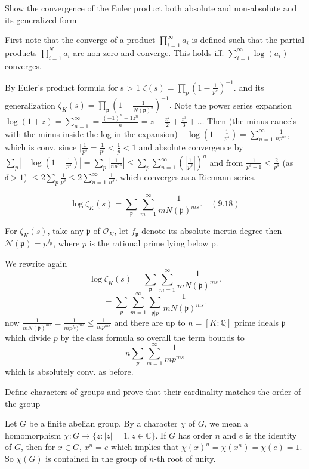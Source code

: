 Show the convergence of the Euler product both absolute and non-absolute
and its generalized form

First note that the converge of a product \( \prod_{i=1}^\infty a_i \) is defined such that
the partial products \( \prod_{i=1}^N a_i \) are non-zero and converge. This holds iff.
\( \sum_{i=1}^\infty \log(a_i) \) converges.

By Euler’s product formula for s > 1
\(\zeta(s) = \prod_{p} \left(1 - \frac{1}{p^s}\right)^{-1}.\)
and its generalization
\(\zeta_K(s) = \prod_{\mathfrak{p}} \left(1 - \frac{1}{N(\mathfrak{p})^s}\right)^{-1}.\)
Note the power series expansion
\( \log(1 + z) = \sum^\infty_{n=1} = \frac{(-1)^n+1z^n}{n} = z - \frac{z^2}{2} + \frac{z^3}{3} + \dots \)
Then (the minus cancels with the minus inside the log in the expansion)
\( -\log(1 - \frac{1}{p^s}) = \sum_{n=1}^\infty \frac{1}{np^{ns}} \), which is conv. since 
\( |\frac{1}{p^s} = \frac{1}{p^\delta} < \frac{1}{p} < 1\)
and absolute convergence by
\( \sum_{p} |-\log(1 - \frac{1}{p^s})| = \sum_{p} |\frac{1}{np^{ns}}| \leq \sum_{p}\sum_{n=1}^\infty (|\frac{1}{p^{\delta}}|)^n\)
and from \( \frac{1}{p^\delta -1} < \frac{2}{p^\delta} \) (as \( \delta > 1 \))
\( \leq 2\sum_p \frac{1}{p^\delta} \leq 2 \sum_{n=1}^\infty \frac{1}{n^\delta}\), which converges as a Riemann series.

\[
\log \zeta_K(s) = \sum_{\mathfrak{p}} \sum_{m=1}^\infty \frac{1}{m N(\mathfrak{p})^{ms}}. \quad (9.18)
\]

For \( \zeta_K(s) \), take any \( \mathfrak{p} \) of \( \mathcal{O}_K \), let \( f_\mathfrak{p} \) denote its absolute inertia degree
then \( \mathcal{N}(\mathfrak{p}) = p^{f_\mathfrak{p}} \), where \( p \) is the rational prime lying below p. 

We rewrite again
\[
\log \zeta_K(s) = \sum_{\mathfrak{p}} \sum_{m=1}^\infty \frac{1}{m N(\mathfrak{p})^{ms}}.
\]
\[
= \sum_{p} \sum_{m=1}^\infty \sum_{\mathfrak{p}|p} \frac{1}{m N(\mathfrak{p})^{ms}}.
\]
now \( \frac{1}{m N(\mathfrak{p})^{ms}} = \frac{1}{mp^{f_\mathfrak{p}})^{ms}} \leq \frac{1}{mp^{ms}} \) 
and there are up to \( n = [K:\mathbb{Q}] \) prime ideals \( \mathfrak{p} \) which divide \( p \) by the class formula
so overall the term bounds to
\[
    n\sum_{p} \sum_{m=1}^\infty \frac{1}{mp^{ms}}
\]
which is absolutely conv. as before.



Define characters of groups and prove that their cardinality matches the order of the group

Let \( G \) be a finite abelian group. By a character \( \chi \) of \( G \), we mean a homomorphism \( \chi : G \rightarrow \{ z : |z| = 1, z \in \mathbb{C} \} \). If \( G \) has order \( n \) and \( e \) is the identity of \( G \), then for \( x \in G \), \( x^n = e \) which implies that \( \chi(x)^n = \chi(x^n) = \chi(e) = 1 \). So \( \chi(G) \) is contained in the group of \( n \)-th root of unity.

